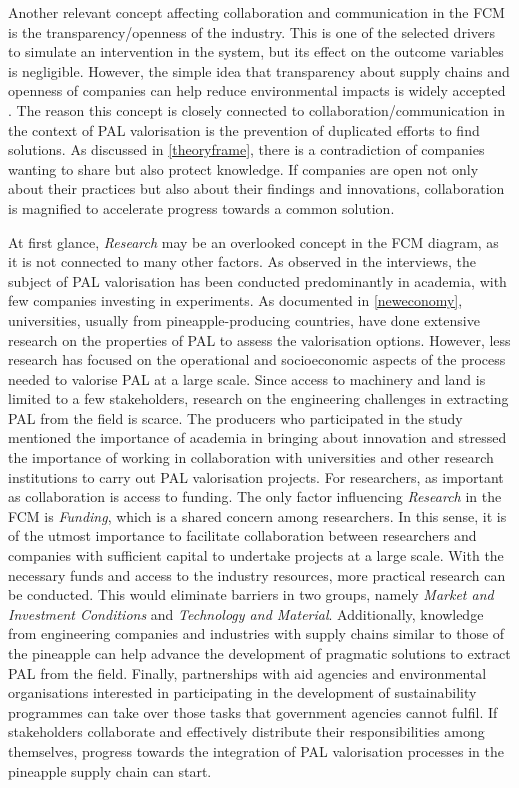 Another relevant concept affecting collaboration and communication in the FCM is the transparency/openness of the industry. This is one of the selected drivers to simulate an intervention in the system, but its effect on the outcome variables is negligible. However, the simple idea that transparency about supply chains and openness of companies can help reduce environmental impacts is widely accepted \citep{kashmanian2017building, jahansoozi2006organization}. The reason this concept is closely connected to collaboration/communication in the context of PAL valorisation is the prevention of duplicated efforts to find solutions. As discussed in \cref{theoryframe}, there is a contradiction of companies wanting to share but also protect knowledge. If companies are open not only about their practices but also about their findings and innovations, collaboration is magnified to accelerate progress towards a common solution.

At first glance, \textit{Research} may be an overlooked concept in the FCM diagram, as it is not connected to many other factors. As observed in the interviews, the subject of PAL valorisation has been conducted predominantly in academia, with few companies investing in experiments. As documented in \cref{neweconomy}, universities, usually from pineapple-producing countries, have done extensive research on the properties of PAL to assess the valorisation options. However, less research has focused on the operational and socioeconomic aspects of the process needed to valorise PAL at a large scale. Since access to machinery and land is limited to a few stakeholders, research on the engineering challenges in extracting PAL from the field is scarce. The producers who participated in the study mentioned the importance of academia in bringing about innovation and stressed the importance of working in collaboration with universities and other research institutions to carry out PAL valorisation projects. For researchers, as important as collaboration is access to funding. The only factor influencing \textit{Research} in the FCM is \textit{Funding}, which is a shared concern among researchers. In this sense, it is of the utmost importance to facilitate collaboration between researchers and companies with sufficient capital to undertake projects at a large scale. With the necessary funds and access to the industry resources, more practical research can be conducted. This would eliminate barriers in two groups, namely \textit{Market and Investment Conditions} and \textit{Technology and Material}. Additionally, knowledge from engineering companies and industries with supply chains similar to those of the pineapple can help advance the development of pragmatic solutions to extract PAL from the field. Finally, partnerships with aid agencies and environmental organisations interested in participating in the development of sustainability programmes can take over those tasks that government agencies cannot fulfil. If stakeholders collaborate and effectively distribute their responsibilities among themselves, progress towards the integration of PAL valorisation processes in the pineapple supply chain can start. 

